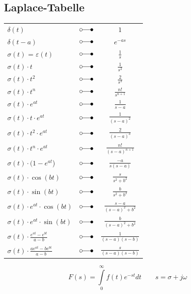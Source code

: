 	\subsection{Laplace-Tabelle}
	\begin{multicols}{2}
		\begin{center}
			\begin{tabular}{|lcc|}
				\hline
				$\delta \left( t \right)$ & $\laplace$ & $1$ \\
				$\delta \left( t - a \right)$ & $\laplace$ & $e^{- a s}$\\
				$\sigma \left( t \right)$ = $\varepsilon \left( t \right)$ & $\laplace$ & $\frac{1}{s}$ \\
				$\sigma \left( t \right) \cdot t$ & $\laplace$ & $\frac{1}{s^2}$\\
				$\sigma \left( t \right) \cdot t^2$ & $\laplace$ & $\frac{2}{s^3}$\\
				$\sigma \left( t \right) \cdot t^n$ & $\laplace$ & $\frac{n!}{s^{n+1}}$\\
				$\sigma \left( t \right) \cdot e^{a t}$ & $\laplace$ &
				$\frac{1}{s-a}$\\
				$\sigma \left( t \right) \cdot t \cdot e^{a t}$ & $\laplace$ &
				$\frac{1}{( s - a )^2}$\\
				$\sigma \left( t \right)\cdot t^2 \cdot e^{a t}$ &
				$\laplace$ & $\frac{2}{{( s - a )}^3}$\\
				$\sigma \left( t \right)\cdot t^n \cdot e^{ a t}$ &
				$\laplace$ & $\frac{n!}{(s-a)^{n+1}}$\\
				$\sigma \left( t \right) \cdot (1-e^{a t}$) & $\laplace$ &
				$\frac{- a}{s ( s - a )}$\\
				$\sigma \left( t \right) \cdot \cos \left(b t \right)$ & $\laplace$ &
				$\frac{s}{ s^2 + b^2}$\\
				$\sigma \left( t \right) \cdot \sin \left(b t \right)$ & $\laplace$ &
				$\frac{b}{s^2 + {b^2}}$\\
				$\sigma \left( t \right) \cdot e^{a t} \cdot \cos \left(b t \right)$ & $\laplace$ &
				$\frac{s- a}{ (s- a)^2 + b^2}$\\
				$\sigma \left( t \right) \cdot e^{a t} \cdot \sin \left(b t \right)$ & $\laplace$ &
				$\frac{b}{(s- a)^2 + {b^2}}$\\
				$\sigma \left( t \right) \cdot \frac{e^{a t} - e^{b t}}{a-b}$ & $\laplace$ & $\frac{1}{(s-a)(s-b)}$ \\
				$\sigma \left( t \right) \cdot \frac{a e^{a t} - b e^{b t}}{a-b}$ & $\laplace$ & $\frac{s}{(s-a)(s-b)}$\\
				\hline
			\end{tabular}
		\end{center}
	\columnbreak
		\begin{center}
	\[\boxed{F(s)=\int\limits_0^\infty f(t)e^{-st}dt} \qquad s=\sigma+j\omega\]\\

\end{center}
\end{multicols}
